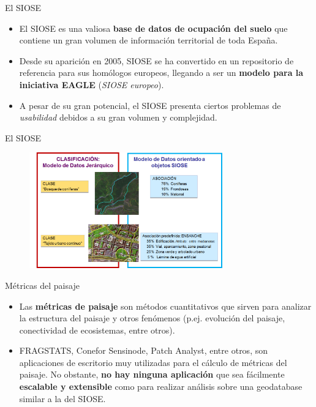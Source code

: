 
\begin{frame}{El SIOSE}
\begin{itemize}
\item El SIOSE es una valiosa \textbf{base de datos de ocupación del suelo} que contiene un gran volumen de información territorial de toda España.
\item Desde su aparición en 2005, SIOSE se ha convertido en un repositorio de referencia para sus homólogos europeos, llegando a ser un \textbf{modelo para la iniciativa EAGLE} (\textit{SIOSE europeo}). 
\item A pesar de su gran potencial, el SIOSE presenta ciertos problemas de \textit{usabilidad} debidos a su gran volumen y complejidad.
\end{itemize}
\end{frame}

\begin{frame}{El SIOSE}
\begin{figure}
\includegraphics[height=5cm]{Introduccion/Figs/siose-oo.png}
\end{figure}
\end{frame}

\begin{frame}{Métricas del paisaje}
\begin{itemize}
\item Las \textbf{métricas de paisaje} son métodos cuantitativos que sirven para analizar la estructura del paisaje y otros fenómenos (p.ej. evolución del paisaje, conectividad de ecosistemas, entre otros).
\item FRAGSTATS, Conefor Sensinode, Patch Analyst, entre otros, son aplicaciones de escritorio muy utilizadas para el cálculo de métricas del paisaje. No obstante, \textbf{no hay ninguna aplicación} que sea fácilmente \textbf{escalable y extensible} como para realizar análisis sobre una geodatabase similar a la del SIOSE.
\end{itemize}
\end{frame}


